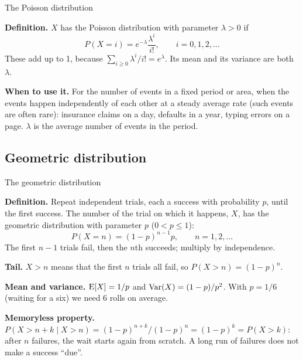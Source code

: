 \begin{key}{The Poisson distribution}
	\setlength{\parskip}{5pt}
	\noindent\begin{minipage}[c]{.48\linewidth}
		\textbf{Definition.} $X$ has the Poisson distribution with parameter
		$\lambda>0$ if
		\[ P(X=i)=e^{-\lambda}\frac{\lambda^i}{i!},\qquad i=0,1,2,\dots \]
		These add up to 1, because $\sum_{i\ge0}\lambda^i/i!=e^{\lambda}$. Its
		mean and its variance are both $\lambda$.
	\end{minipage}\hfill
	\begin{minipage}[c]{.5\linewidth}
		\centering
		\figpoisson
	\end{minipage}

	\textbf{When to use it.} For the number of events in a fixed period or
	area, when the events happen independently of each other at a steady
	average rate (such events are often rare): insurance claims on a day, defaults in a year, typing errors on
	a page. $\lambda$ is the average number of events in the period.
\end{key}


\subsection*{Geometric distribution}

\begin{key}{The geometric distribution}
	\setlength{\parskip}{5pt}
	\noindent\begin{minipage}[c]{.48\linewidth}
		\textbf{Definition.} Repeat independent trials, each a success with
		probability $p$, until the first success. The number of the trial on
		which it happens, $X$, has the geometric distribution with parameter
		$p$ ($0<p\le1$):
		\[ P(X=n)=(1-p)^{n-1}p,\qquad n=1,2,\dots \]
		The first $n-1$ trials fail, then the $n$th succeeds; multiply by
		independence.
	\end{minipage}\hfill
	\begin{minipage}[c]{.5\linewidth}
		\centering
		\figgeometric
	\end{minipage}

	\textbf{Tail.} $X>n$ means that the first $n$ trials all fail, so
	$P(X>n)=(1-p)^n$.

	\textbf{Mean and variance.} $\operatorname{E}[X]=1/p$ and $\operatorname{Var}(X)=(1-p)/p^2$. With
	$p=1/6$ (waiting for a six) we need 6 rolls on average.

	\textbf{Memoryless property.} $P(X>n+k\mid X>n)=(1-p)^{n+k}/(1-p)^n
		=(1-p)^k=P(X>k)$: after $n$ failures, the wait starts again from
	scratch. A long run of failures does not make a success ``due''.
\end{key}

